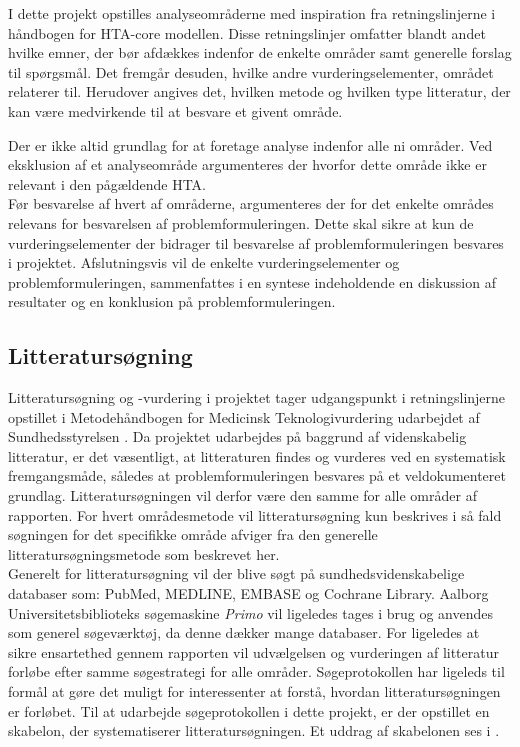 I dette projekt opstilles analyseområderne med inspiration fra retningslinjerne i håndbogen for HTA-core modellen. Disse retningslinjer omfatter blandt andet hvilke emner, der bør afdækkes indenfor de enkelte områder samt generelle forslag til spørgsmål. Det fremgår desuden, hvilke andre vurderingselementer, området relaterer til. Herudover angives det, hvilken metode og hvilken type litteratur, der kan være medvirkende til at besvare et givent område. \citep{HTAcore} 



Der er ikke altid grundlag for at foretage analyse indenfor alle ni områder. Ved eksklusion af et analyseområde argumenteres der hvorfor dette område ikke er relevant i den pågældende HTA. \citep{HTAcore} \\
Før besvarelse af hvert af områderne, argumenteres der for det enkelte områdes relevans for besvarelsen af problemformuleringen. Dette skal sikre at kun de vurderingselementer der bidrager til besvarelse af problemformuleringen besvares i projektet. 
Afslutningsvis vil de enkelte vurderingselementer og problemformuleringen, sammenfattes i en syntese indeholdende en diskussion af resultater og en konklusion på problemformuleringen. 

\subsection{Litteratursøgning}
Litteratursøgning og -vurdering i projektet tager udgangspunkt i retningslinjerne opstillet i Metodehåndbogen for Medicinsk Teknologivurdering udarbejdet af Sundhedsstyrelsen \citep{metodehaandbogen}. Da projektet udarbejdes på baggrund af videnskabelig litteratur, er det væsentligt, at litteraturen findes og vurderes ved en systematisk fremgangsmåde, således at problemformuleringen besvares på et veldokumenteret grundlag. Litteratursøgningen vil derfor være den samme for alle områder af rapporten. For hvert områdesmetode vil litteratursøgning kun beskrives i så fald søgningen for det specifikke område afviger fra den generelle litteratursøgningsmetode som beskrevet her. \\
Generelt for litteratursøgning vil der blive søgt på sundhedsvidenskabelige databaser som: PubMed, MEDLINE, EMBASE og Cochrane Library. Aalborg Universitetsbiblioteks søgemaskine \textit{Primo} vil ligeledes tages i brug og anvendes som generel søgeværktøj, da denne dækker mange databaser. For ligeledes at sikre ensartethed gennem rapporten vil udvælgelsen og vurderingen af litteratur forløbe efter samme søgestrategi for alle områder. Søgeprotokollen har ligeleds til formål at gøre det muligt for interessenter at forstå, hvordan litteratursøgningen er forløbet. \citep{metodehaandbogen}
Til at udarbejde søgeprotokollen i dette projekt, er der opstillet en skabelon, der systematiserer litteratursøgningen. Et uddrag af skabelonen ses i .

